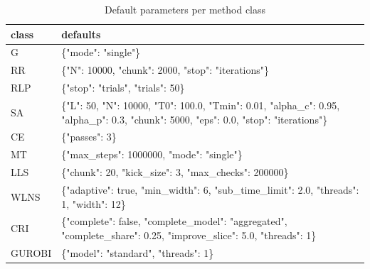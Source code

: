 \begin{table}[htbp]
\centering
\small
\caption{Default parameters per method class}
\label{tab:class_defaults}
\begin{tabular}{ll}
\toprule
class & defaults \\
\midrule
G & \{"mode": "single"\} \\
RR & \{"N": 10000, "chunk": 2000, "stop": "iterations"\} \\
RLP & \{"stop": "trials", "trials": 50\} \\
SA & \{"L": 50, "N": 10000, "T0": 100.0, "Tmin": 0.01, "alpha\_c": 0.95, "alpha\_p": 0.3, "chunk": 5000, "eps": 0.0, "stop": "iterations"\} \\
CE & \{"passes": 3\} \\
MT & \{"max\_steps": 1000000, "mode": "single"\} \\
LLS & \{"chunk": 20, "kick\_size": 3, "max\_checks": 200000\} \\
WLNS & \{"adaptive": true, "min\_width": 6, "sub\_time\_limit": 2.0, "threads": 1, "width": 12\} \\
CRI & \{"complete": false, "complete\_model": "aggregated", "complete\_share": 0.25, "improve\_slice": 5.0, "threads": 1\} \\
GUROBI & \{"model": "standard", "threads": 1\} \\
\bottomrule
\end{tabular}
\end{table}
